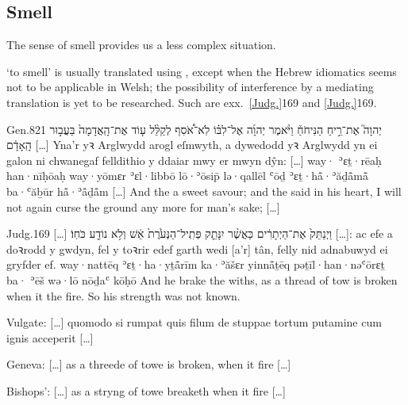 \subsection{Smell}

{\click} The sense of smell provides us a less complex situation.




\begin{paper}
	 ‘to smell’ is usually translated using , except when the Hebrew idiomatics seems not to be applicable in Welsh; the possibility of interference by a mediating translation is yet to be researched. Such are exx.~\vref{Judg.}{16}{9}{} and \vref{Judg.}{16}{9}{}.
\end{paper}

\begin{example}{Gen.}{8}{21}{}{}
	\quoling
	{ יְהוָה֮ אֶת־רֵ֣יחַ הַנִּיחֹחַ֒ וַיֹּ֨אמֶר יְהוָ֜ה אֶל־לִבּ֗וֹ לֹֽא־אֹ֠סִף לְקַלֵּ֨ל ע֤וֹד אֶת־הָֽאֲדָמָה֙ בַּעֲב֣וּר הָֽאָדָ֔ם […]}
	{Yna’r  yꝛ Arglwydd arogl eſmwyth, a dywedodd yꝛ Arglwydd yn ei galon ni chwanegaf felldithio y ddaiar mwy er mwyn dŷn: […]}
	{way· {\YHWH} ʾɛṯ·rēaḥ han·nīḥōaḥ way·yōmɛr {\YHWH} ʾɛl·libbō lō·ʾōsip̄ lə·qallēl ʿōḏ ʾɛṯ·hå̄·ʾăḏå̄må̄ ba·ʿăḇūr hå̄·ʾå̄ḏå̄m […]}
	{And the {\LORD}  a sweet savour; and the {\LORD} said in his heart, I will not again curse the ground any more for man’s sake; […]}
\end{example}

\begin{example}{Judg.}{16}{9}{}{}
	\quoling
	{[…] וַיְנַתֵּק֙ אֶת־הַיְתָרִ֔ים כַּאֲשֶׁ֨ר יִנָּתֵ֤ק פְּתִֽיל־הַנְּעֹ֙רֶת֙  אֵ֔שׁ וְלֹ֥א נוֹדַ֖ע כֹּחֽוֹ׃}
	{[…]: ac efe a doꝛrodd y gwdyn, fel y toꝛrir edef garth wedi  [a’r] tân, felly nid adnabuwyd ei gryfder ef.}
	{way·nattēq ʾɛṯ·ha·yṯå̄rīm ka·ʾăšɛr yinnå̄ṯēq pəṯīl·han·nəʿōrɛṯ ba· ʾēš wə·lō nōḏaʿ kōḥō}
	{And he brake the withs, as a thread of tow is broken when it  the fire. So his strength was not known.}
\end{example}
\begin{compactdesc}\small
	\item [Vulgate:] […] quomodo si rumpat quis filum de stuppae tortum putamine cum  ignis acceperit […]
	\item [Geneva:] […] as a threede of towe is broken, when it  fire […]
	\item [Bishops’:] […] as a stryng of towe breaketh when it  fire […]
\end{compactdesc}

